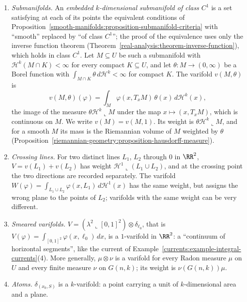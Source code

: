 \begin{example}\label{currents:example-varifolds}
\begin{enumerate}
\item \emph{Submanifolds.} An \emph{embedded $k$-dimensional submanifold of class $C^1$} is a set satisfying at each of its points the equivalent conditions of
Proposition~\ref{smooth-manifolds:proposition-submanifold-criteria} with ``smooth'' replaced by ``of class $C^1$''; the proof of the equivalence uses only the inverse function theorem
(Theorem~\ref{real-analysis:theorem-inverse-function}), which holds in class $C^1$. Let $M \subseteq U$ be such a submanifold with $\mathcal{H}^k(M \cap K) < \infty$ for every compact $K \subseteq U$, and let
$\theta \colon M \to (0, \infty)$ be a Borel function with $\int_{M \cap K}\theta\,d\mathcal{H}^k < \infty$ for compact $K$. The varifold $v(M, \theta)$ is
\[
v(M, \theta)(\varphi) = \int_M\varphi(x, T_xM)\,\theta(x)\,d\mathcal{H}^k(x),
\]
the image of the measure $\theta\mathcal{H}^k\llcorner M$ under the map $x \mapsto (x, T_xM)$, which is continuous on $M$. We write $v(M) = v(M, 1)$. Its weight is $\theta\mathcal{H}^k\llcorner M$, and for a
smooth $M$ its mass is the Riemannian volume of $M$ weighted by $\theta$ (Proposition~\ref{riemannian-geometry:proposition-hausdorff-measure}).
\item \emph{Crossing lines.} For two distinct lines $L_1$, $L_2$ through $0$ in $\RR^2$, $V = v(L_1) + v(L_2)$ has weight $\mathcal{H}^1\llcorner(L_1 \cup L_2)$, and at the crossing point the two
directions are recorded separately. The varifold $W(\varphi) = \int_{L_1 \cup L_2}\varphi(x, L_1)\,d\mathcal{H}^1(x)$ has the same weight, but assigns the wrong plane to the points of $L_2$; varifolds with the
same weight can be very different.
\item \emph{Smeared varifolds.} $V = (\lambda^2\llcorner[0, 1]^2) \otimes \delta_{\ell_0}$, that is $V(\varphi) = \int_{[0, 1]^2}\varphi(x, \ell_0)\,dx$, is a $1$-varifold in $\RR^2$: a ``continuum of
horizontal segments'', like the current of Example~\ref{currents:example-integral-currents}(4). More generally, $\mu \otimes \nu$ is a varifold for every Radon measure $\mu$ on $U$ and every finite measure $\nu$
on $G(n, k)$; its weight is $\nu(G(n, k))\mu$.
\item \emph{Atoms.} $\delta_{(x_0, S)}$ is a $k$-varifold: a point carrying a unit of $k$-dimensional area and a plane.
\end{enumerate}
\end{example}

